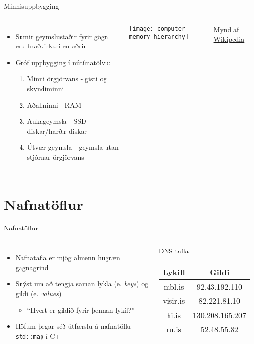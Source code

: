 \documentclass{beamer}
\begin{document}
\begin{frame}{Minnisuppbygging}
\begin{columns}
\begin{itemize}
 \item Sumir geymslustaðir fyrir gögn eru hraðvirkari en aðrir
 \item Gróf uppbygging í nútímatölvu:
 \begin{enumerate}
  \item Minni örgjörvans  - gisti  og skyndiminni 
  \item Aðalminni   - RAM
  \item Aukageymsla  - SSD diskar/harðir diskar
  \item Útvær geymsla  - geymsla utan stjórnar örgjörvans
 \end{enumerate}
\end{itemize}
\texttt{[image: computer-memory-hierarchy]}
\begin{center}
\href{https://en.wikipedia.org/wiki/Memory\_hierarchy}{Mynd af Wikipedia}
\end{center}
\end{columns}
\end{frame}

\section{Nafnatöflur}

\begin{frame}{Nafnatöflur}
\begin{columns}
\begin{itemize}
 \item Nafnatafla  er mjög almenn hugræn gagnagrind
 \item Snýst um að tengja saman lykla (e. \emph{keys}) og gildi (e. \emph{values})
 \begin{itemize}
  \item ``Hvert er gildið fyrir þennan lykil?''
 \end{itemize}
 \item Höfum þegar séð útfærslu á nafnatöflu - \texttt{std::map} í C++
\end{itemize}
\begin{center}
DNS tafla
\begin{tabular}{cc}
\toprule
Lykill&Gildi\\
\midrule
mbl.is&92.43.192.110\\
visir.is&82.221.81.10\\
hi.is&130.208.165.207\\
ru.is&52.48.55.82\\
\bottomrule
\end{tabular}
\end{center}
\end{columns}
\end{frame}
\end{document}
